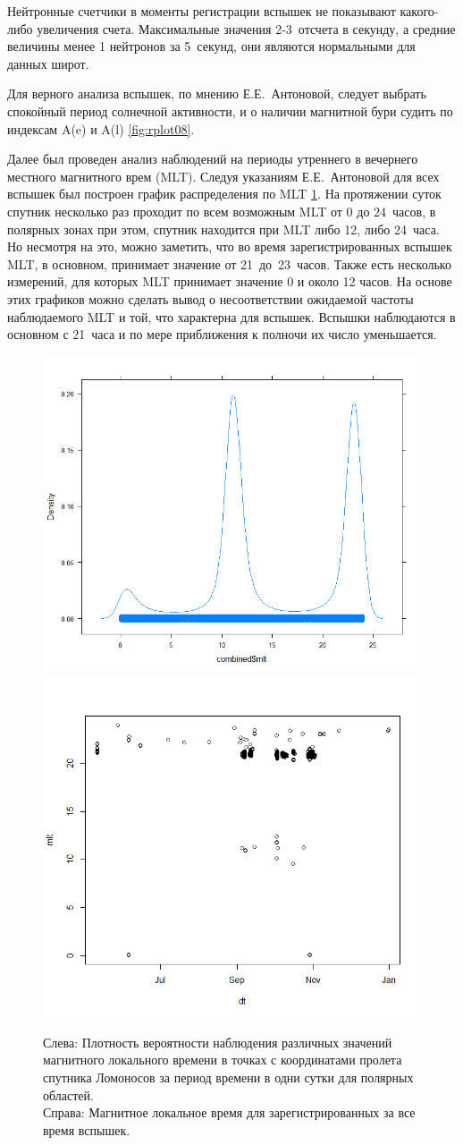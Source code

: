 Нейтронные счетчики в моменты регистрации вспышек не показывают какого-либо увеличения счета. Максимальные значения 2-3~отсчета в секунду, а средние величины менее 1 нейтронов за 5~секунд, они являются нормальными для данных широт. 

Для верного анализа вспышек, по мнению Е.Е.~Антоновой, следует выбрать спокойный период солнечной активности, и о наличии магнитной бури судить по индексам A(e) и A(l) \ref{fig:rplot08}. 

Далее был проведен анализ наблюдений на периоды утреннего в вечернего местного магнитного врем (MLT). Следуя указаниям Е.Е.~Антоновой для всех вспышек был построен график распределения по MLT \ref{fig:rplot15}. На протяжении суток спутник несколько раз проходит по всем возможным MLT от 0 до 24~часов, в полярных зонах при этом, спутник находится при MLT либо 12, либо 24~часа. Но несмотря на это, можно заметить, что во время зарегистрированных вспышек MLT, в основном, принимает значение от 21~до~23~часов. Также есть несколько измерений, для которых MLT принимает значение 0 и около 12 часов. На основе этих графиков можно сделать вывод о несоответствии ожидаемой частоты наблюдаемого MLT и той, что характерна для вспышек. Вспышки наблюдаются в основном с 21~часа и по мере приближения к полночи их число уменьшается.


\begin{figure}
	\centering
	\includegraphics[width=0.49\linewidth]{images/Flash/Rplot020}
	\includegraphics[width=0.49\linewidth, trim={0 1cm 0 0}, clip]{images/Flash/Rplot14}
	\caption[Распределение MLT зарегистрированных вспышек]{Слева: Плотность вероятности наблюдения различных значений магнитного локального времени в точках с координатами пролета спутника Ломоносов за период времени в одни сутки для полярных областей. \\Справа: Магнитное локальное время для зарегистрированных за все время вспышек.}
	\label{fig:rplot15}
\end{figure}


